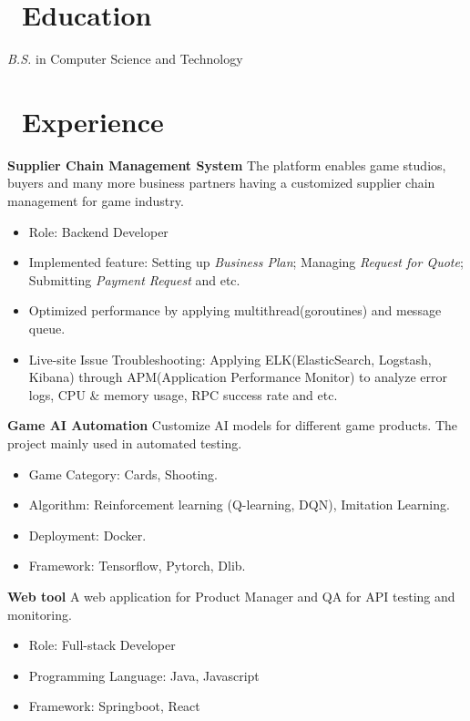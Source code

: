 \documentclass{resume}
\begin{document}



\section{\faGraduationCap\ Education}
\textit{B.S.} in Computer Science and Technology

\section{\faUsers\ Experience}
\textbf{Supplier Chain Management System}
The platform enables game studios, buyers and many more business partners having a customized supplier chain management for game industry.
\begin{itemize}
  \item Role: Backend Developer
  \item Implemented feature: Setting up \textit{Business Plan}; Managing \textit{Request for Quote}; Submitting \textit{Payment Request} and etc.
  \item Optimized performance by applying multithread(goroutines) and message queue.
  \item Live-site Issue Troubleshooting: Applying ELK(ElasticSearch, Logstash, Kibana) through APM(Application Performance Monitor) to analyze error logs, CPU & memory usage, RPC success rate and etc.
\end{itemize}
\b
\textbf{Game AI Automation}
Customize AI models for different game products. The project mainly used in automated testing.
\begin{itemize}
  \item Game Category: Cards, Shooting.
  \item Algorithm: Reinforcement learning (Q-learning, DQN), Imitation Learning.
  \item Deployment: Docker.
  \item Framework: Tensorflow, Pytorch, Dlib.
\end{itemize}

\textbf{Web tool}
A web application for Product Manager and QA for API testing and monitoring.
\begin{itemize}
  \item Role: Full-stack Developer
  \item Programming Language: Java, Javascript
  \item Framework: Springboot, React
\end{itemize}
\end{document}
